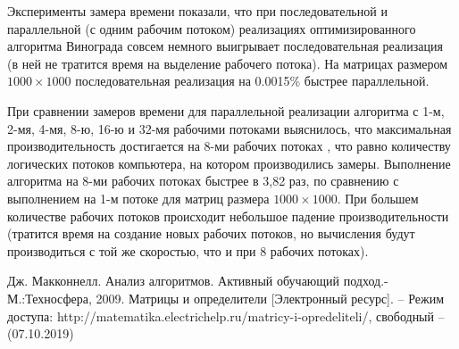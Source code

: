 \documentclass[a4paper,14pt]{article}
\begin{document}
       Эксперименты замера времени показали, что при последовательной и параллельной (с одним рабочим потоком) реализациях оптимизированного алгоритма Винограда совсем немного выигрывает последовательная реализация (в ней не тратится время на выделение рабочего потока). На матрицах размером $1000 \times 1000$ последовательная реализация на 0.0015\% быстрее параллельной.
       
        При сравнении замеров времени для параллельной реализации алгоритма с 1-м, 2-мя, 4-мя, 8-ю, 16-ю и 32-мя рабочими потоками выяснилось, что максимальная производительность достигается на 8-ми рабочих потоках , что равно количеству логических потоков компьютера, на котором производились замеры. Выполнение алгоритма на 8-ми рабочих потоках быстрее в 3,82 раз, по сравнению с выполнением на 1-м потоке для матриц размера $1000 \times 1000$. При большем количестве рабочих потоков происходит небольшое падение производительности (тратится время на создание новых рабочих потоков, но вычисления будут производиться с той же скоростью, что и при 8 рабочих потоках).



\pagebreak
{}
\begin{thebibliography}{4}
Дж. Макконнелл. Анализ алгоритмов. Активный обучающий подход.-
М.:Техносфера, 2009.
Матрицы и определители [Электронный ресурс]. – Режим доступа: http://matematika.electrichelp.ru/matricy-i-opredeliteli/, свободный – (07.10.2019)

\end{thebibliography}
\end{document}
